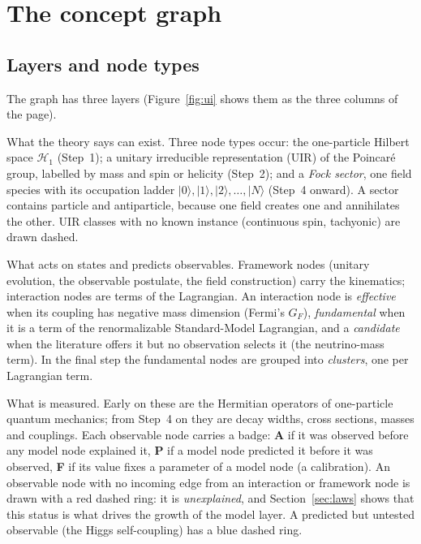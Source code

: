 \documentclass[11pt,a4paper]{article}
\newcommand{\lay}[1]{\textsf{#1}}
\begin{document}
\section{The concept graph}\label{sec:graph}

\subsection{Layers and node types}
The graph has three layers (Figure~\ref{fig:ui} shows them as the three columns of the page).
\begin{description}[style=nextline]
\item[\lay{State} layer $V_S$.] What the theory says can exist. Three node types occur: the one-particle Hilbert space $\mathcal H_1$ (Step~1); a unitary irreducible representation (UIR) of the Poincaré group, labelled by mass and spin or helicity (Step~2); and a \emph{Fock sector}, one field species with its occupation ladder $|0\rangle, |1\rangle, |2\rangle, \dots, |N\rangle$ (Step~4 onward). A sector contains particle and antiparticle, because one field creates one and annihilates the other. UIR classes with no known instance (continuous spin, tachyonic) are drawn dashed.
\item[\lay{Model} layer $V_M$.] What acts on states and predicts observables. Framework nodes (unitary evolution, the observable postulate, the field construction) carry the kinematics; interaction nodes are terms of the Lagrangian. An interaction node is \emph{effective} when its coupling has negative mass dimension (Fermi's $G_F$), \emph{fundamental} when it is a term of the renormalizable Standard-Model Lagrangian, and a \emph{candidate} when the literature offers it but no observation selects it (the neutrino-mass term). In the final step the fundamental nodes are grouped into \emph{clusters}, one per Lagrangian term.
\item[\lay{Observable} layer $V_O$.] What is measured. Early on these are the Hermitian operators of one-particle quantum mechanics; from Step~4 on they are decay widths, cross sections, masses and couplings. Each observable node carries a badge: \textbf{A} if it was observed before any model node explained it, \textbf{P} if a model node predicted it before it was observed, \textbf{F} if its value fixes a parameter of a model node (a calibration). An observable node with no incoming edge from an interaction or framework node is drawn with a red dashed ring: it is \emph{unexplained}, and Section~\ref{sec:laws} shows that this status is what drives the growth of the model layer. A predicted but untested observable (the Higgs self-coupling) has a blue dashed ring.
\end{description}
\end{document}
